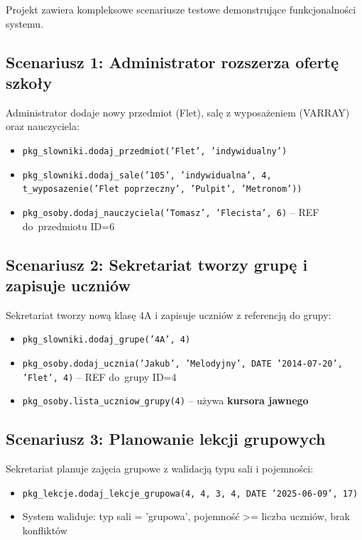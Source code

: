 \documentclass[12pt,a4paper]{article}
\begin{document}
Projekt zawiera kompleksowe scenariusze testowe demonstrujące funkcjonalności systemu.

\subsection{Scenariusz 1: Administrator rozszerza ofertę szkoły}

Administrator dodaje nowy przedmiot (Flet), salę z wyposażeniem (VARRAY) oraz nauczyciela:

\begin{itemize}[nosep]
    \item \texttt{pkg\_slowniki.dodaj\_przedmiot('Flet', 'indywidualny')}
    \item \texttt{pkg\_slowniki.dodaj\_sale('105', 'indywidualna', 4, t\_wyposazenie('Flet poprzeczny', 'Pulpit', 'Metronom'))}
    \item \texttt{pkg\_osoby.dodaj\_nauczyciela('Tomasz', 'Flecista', 6)} -- REF do~przedmiotu ID=6
\end{itemize}

\subsection{Scenariusz 2: Sekretariat tworzy grupę i zapisuje uczniów}

Sekretariat tworzy nową klasę 4A i zapisuje uczniów z referencją do grupy:

\begin{itemize}[nosep]
    \item \texttt{pkg\_slowniki.dodaj\_grupe('4A', 4)}
    \item \texttt{pkg\_osoby.dodaj\_ucznia('Jakub', 'Melodyjny', DATE '2014-07-20', 'Flet', 4)} -- REF do~grupy ID=4
    \item \texttt{pkg\_osoby.lista\_uczniow\_grupy(4)} -- używa \textbf{kursora jawnego}
\end{itemize}

\subsection{Scenariusz 3: Planowanie lekcji grupowych}

Sekretariat planuje zajęcia grupowe z walidacją typu sali i pojemności:

\begin{itemize}[nosep]
    \item \texttt{pkg\_lekcje.dodaj\_lekcje\_grupowa(4, 4, 3, 4, DATE '2025-06-09', 17)}
    \item System waliduje: typ sali = 'grupowa', pojemność >= liczba uczniów, brak konfliktów
\end{itemize}
\end{document}
